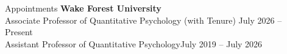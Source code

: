 \begin{rSection}{\textrm{Appointments}}
{\bf Wake Forest University}\\
Associate Professor of Quantitative Psychology  (with Tenure) \hfill{July 2026 – Present}\\
Assistant Professor of Quantitative Psychology\hfill{July 2019 – July 2026}
\vspace{-1ex}
\end{rSection}

